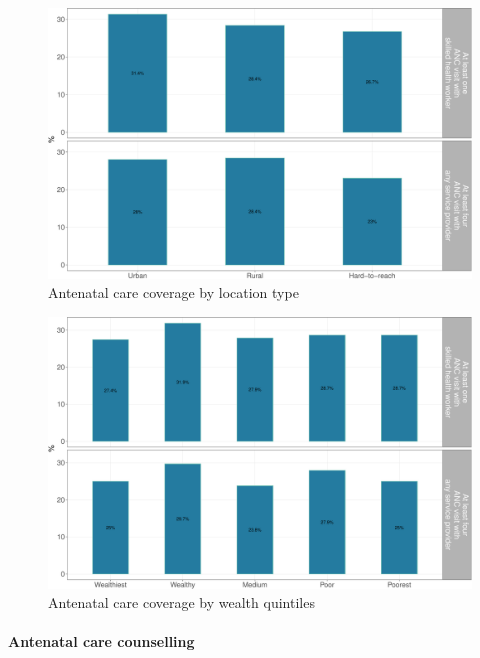 \documentclass[12pt,a4paper]{article}
\let\oldparagraph\paragraph
\renewcommand{\paragraph}[1]{\oldparagraph{#1}\mbox{}}
\begin{document}
\begin{figure}[H]

{\centering \includegraphics{kayahReport_files/figure-latex/anc1plot-1} 

}

\caption{Antenatal care coverage by location type}\label{fig:anc1plot}
\end{figure}

\begin{figure}[H]

{\centering \includegraphics{kayahReport_files/figure-latex/anc2plot-1} 

}

\caption{Antenatal care coverage by wealth quintiles}\label{fig:anc2plot}
\end{figure}

\hypertarget{ancCounselling}{%
\paragraph{Antenatal care counselling}\label{ancCounselling}}
\end{document}
